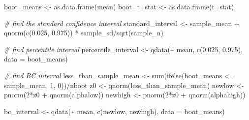 \documentclass[12pt]{article}
\newenvironment{Shaded}{\begin{snugshade}}{\end{snugshade}}
\newcommand{\AttributeTok}[1]{\textcolor[rgb]{0.77,0.63,0.00}{#1}}
\newcommand{\CommentTok}[1]{\textcolor[rgb]{0.56,0.35,0.01}{\textit{#1}}}
\newcommand{\DecValTok}[1]{\textcolor[rgb]{0.00,0.00,0.81}{#1}}
\newcommand{\FloatTok}[1]{\textcolor[rgb]{0.00,0.00,0.81}{#1}}
\newcommand{\FunctionTok}[1]{\textcolor[rgb]{0.00,0.00,0.00}{#1}}
\newcommand{\NormalTok}[1]{#1}
\newcommand{\OtherTok}[1]{\textcolor[rgb]{0.56,0.35,0.01}{#1}}
\newcommand{\SpecialCharTok}[1]{\textcolor[rgb]{0.00,0.00,0.00}{#1}}
\begin{document}
\begin{Shaded}
\begin{Highlighting}[]
\NormalTok{  boot\_means }\OtherTok{\textless{}{-}} \FunctionTok{as.data.frame}\NormalTok{(mean)}
\NormalTok{  boot\_t\_stat }\OtherTok{\textless{}{-}} \FunctionTok{as.data.frame}\NormalTok{(t\_stat)}
  
  \CommentTok{\# find the standard confidence interval}
\NormalTok{  standard\_interval }\OtherTok{\textless{}{-}}\NormalTok{ sample\_mean }\SpecialCharTok{+} \FunctionTok{qnorm}\NormalTok{(}\FunctionTok{c}\NormalTok{(}\FloatTok{0.025}\NormalTok{, }\FloatTok{0.975}\NormalTok{)) }\SpecialCharTok{*}\NormalTok{ sample\_sd}\SpecialCharTok{/}\FunctionTok{sqrt}\NormalTok{(sample\_n)}
  
  \CommentTok{\# find percentile interval}
\NormalTok{  percentile\_interval }\OtherTok{\textless{}{-}} \FunctionTok{qdata}\NormalTok{(}\SpecialCharTok{\textasciitilde{}}\NormalTok{ mean, }\FunctionTok{c}\NormalTok{(}\FloatTok{0.025}\NormalTok{, }\FloatTok{0.975}\NormalTok{), }\AttributeTok{data =}\NormalTok{ boot\_means)}
  
  \CommentTok{\# find BC interval}
\NormalTok{  less\_than\_sample\_mean }\OtherTok{\textless{}{-}} \FunctionTok{sum}\NormalTok{(}\FunctionTok{ifelse}\NormalTok{(boot\_means }\SpecialCharTok{\textless{}=}\NormalTok{ sample\_mean, }\DecValTok{1}\NormalTok{, }\DecValTok{0}\NormalTok{))}\SpecialCharTok{/}\NormalTok{nboot}
\NormalTok{  z0 }\OtherTok{\textless{}{-}} \FunctionTok{qnorm}\NormalTok{(less\_than\_sample\_mean)}
\NormalTok{  newlow }\OtherTok{\textless{}{-}} \FunctionTok{pnorm}\NormalTok{(}\DecValTok{2}\SpecialCharTok{*}\NormalTok{z0 }\SpecialCharTok{+} \FunctionTok{qnorm}\NormalTok{(alphalow))}
\NormalTok{  newhigh }\OtherTok{\textless{}{-}} \FunctionTok{pnorm}\NormalTok{(}\DecValTok{2}\SpecialCharTok{*}\NormalTok{z0 }\SpecialCharTok{+} \FunctionTok{qnorm}\NormalTok{(alphahigh))}

\NormalTok{  bc\_interval }\OtherTok{\textless{}{-}} \FunctionTok{qdata}\NormalTok{(}\SpecialCharTok{\textasciitilde{}}\NormalTok{ mean, }\FunctionTok{c}\NormalTok{(newlow, newhigh), }\AttributeTok{data =}\NormalTok{ boot\_means)}
  

\end{Highlighting}
\end{Shaded}
\end{document}
